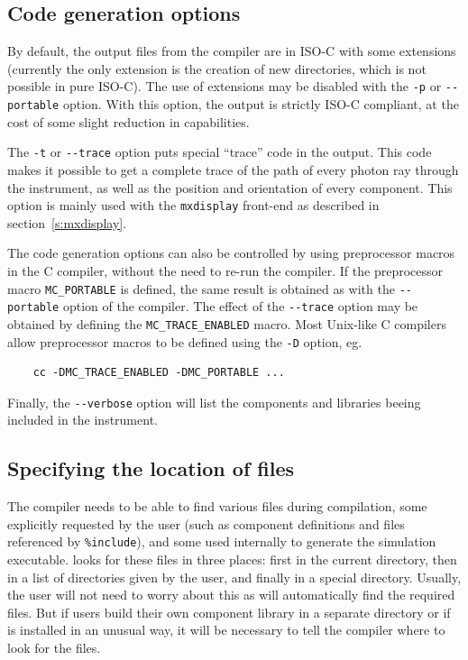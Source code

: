 \subsection{Code generation options}

By default, the output files from the \MCX compiler are in ISO-C with
some extensions (currently the only extension is the creation of new
directories, which is not possible in pure ISO-C). The use of
extensions may be disabled with the \verb+-p+ or \verb+--portable+
option. With this option, the output is strictly ISO-C compliant, at
the cost of some slight reduction in capabilities.

The \verb+-t+ or \verb+--trace+ option puts special ``trace'' code in
the output. This code makes it possible to get a complete trace of the
path of every photon ray through the instrument, as well as the position
and orientation of every component. This option is mainly used with the
\verb+mxdisplay+ front-end as described in section~\ref{s:mxdisplay}.

The code generation options can also be controlled by using preprocessor
macros in the C compiler, without the need to re-run the \MCX
compiler. If the preprocessor macro \verb+MC_PORTABLE+ is defined, the
same result is obtained as with the \verb+--portable+ option of the
\MCX compiler. The effect of the \verb+--trace+ option may be obtained
by defining the \verb+MC_TRACE_ENABLED+ macro. Most Unix-like C
compilers allow preprocessor macros to be defined using the \verb+-D+
option, eg.
\begin{verbatim}
    cc -DMC_TRACE_ENABLED -DMC_PORTABLE ...
\end{verbatim}
Finally, the \verb+--verbose+ option will list the components and libraries beeing
included in the instrument.

\subsection{Specifying the location of files}
\label{s:files}

The \MCX compiler needs to be able to find various files during
compilation, some explicitly requested by the user (such as component
definitions and files referenced by \verb+%include+), 
and some used internally to generate the simulation executable. \MCX looks for these
files in three places: first in the current directory, then in a list of
directories given by the user, and finally in a special \MCX
directory. Usually, the user will not need to worry about this as \MCX
will automatically find the required files. But if users build their own
component library in a separate directory or if \MCX is installed in an
unusual way, it will be necessary to tell the compiler where to look
for the files.

